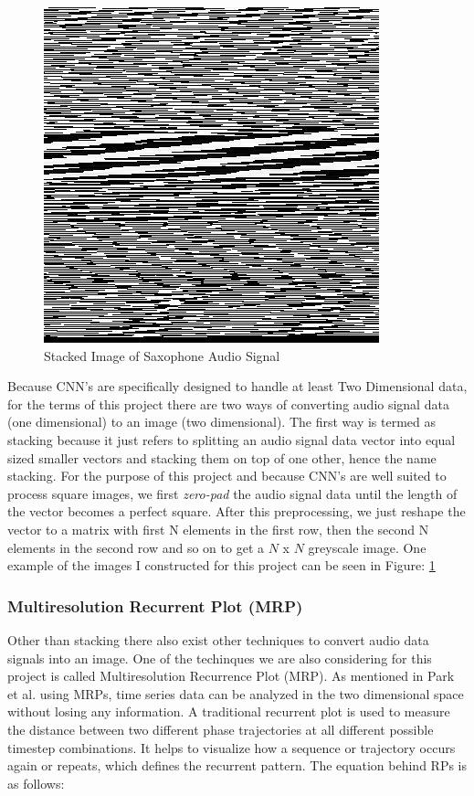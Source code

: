 \documentclass[letterpaper, 10 pt, conference]{ieeeconf}  %
\begin{document}
\begin{figure}[!h]
\centering
\includegraphics[scale=0.30]{../figs/stacking/sax.jpg}	
\caption{Stacked Image of Saxophone Audio Signal}
\label{fig:Sax_Stack} 
\end{figure}

Because CNN's are specifically designed to handle at least Two Dimensional data, for the terms of this project there are two ways of converting audio signal data (one dimensional) to an image (two dimensional). The first way is termed as stacking because it just refers to splitting an audio signal data vector into equal sized smaller vectors and stacking them on top of one other, hence the name stacking. For the purpose of this project and because CNN's are well suited to process square images, we first \textit{zero-pad} the audio signal data until the length of the vector becomes a perfect square. After this preprocessing, we just reshape the vector to a matrix with first N elements in the first row, then the second N elements in the second row and so on to get a $N$ x $N$ greyscale image. One example of the images I constructed for this project can be seen in Figure: \ref{fig:Sax_Stack}

\subsubsection{Multiresolution Recurrent Plot (MRP)}

Other than stacking there also exist other techniques to convert audio data signals into an image. One of the techinques we are also considering for this project is called Multiresolution Recurrence Plot (MRP). As mentioned in Park et al. \cite{cnn_music_mrp} using MRPs, time series data can be analyzed in the two dimensional space without losing any information. A traditional recurrent plot is used to measure the distance between two different phase trajectories at all different possible timestep combinations. It helps to visualize how a sequence or trajectory occurs again or repeats, which defines the recurrent pattern. The equation behind RPs is as follows:
\end{document}
